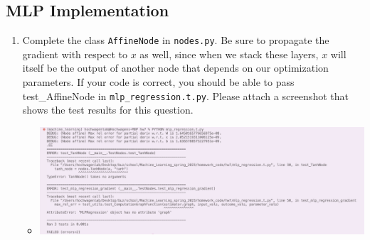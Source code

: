 \documentclass{article}
\theoremstyle{plain}
\theoremstyle{definition}
\begin{document}
\subsection{MLP Implementation}
\begin{enumerate}
\setcounter{enumi}{\value{saveenum}}
\item Complete the class \texttt{AffineNode} in \texttt{nodes.py}. Be sure
to propagate the gradient with respect to $x$ as well, since when
we stack these layers, $x$ will itself be the output of another node
that depends on our optimization parameters. If your code is correct, you should be able to pass test\_AffineNode in \texttt{mlp\_regression.t.py}. Please attach a screenshot that shows the test results for this question.
\begin{itemize}
    \color{blue}
         \item \includegraphics[width = 15cm]{homework_code/hw7/immages/hw_7_9.png}
\end{itemize}


\end{enumerate}
\end{document}

